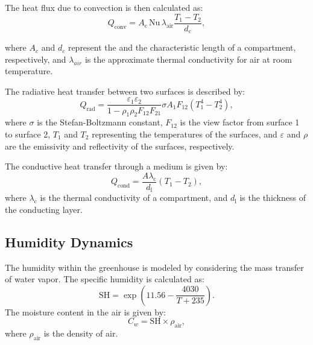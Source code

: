 \documentclass[conference]{IEEEtran}
\begin{document}
The heat flux due to convection is then calculated as:
\begin{equation}
    Q_{\text{conv}} = A_{\text{c}}\, \text{Nu}\, \lambda_{\text{air}} \frac{T_1 - T_2}{d_{\text{c}}},
\end{equation}

where \(A_c\) and \(d_c\) represent the and the characteristic length of a compartment, respectively, and \(\lambda_{air}\) is the approximate thermal conductivity for air at room temperature.

The radiative heat transfer between two surfaces is described by:
\begin{equation}
    Q_{\text{rad}} = \frac{\varepsilon_1  \varepsilon_2}{1 - \rho_1  \rho_2  F_{12}  F_{21}}  \sigma  A_1  F_{12}  \left( T_1^4 - T_2^4 \right),
\end{equation}
where \(\sigma \) is the Stefan-Boltzmann constant, \(F_{12}\) is the view factor from surface 1 to surface 2, \(T_1\) and \(T_2\) representing the temperatures of the surfaces, and \(\varepsilon \) and \(\rho \) are the emissivity and reflectivity of the surfaces, respectively.

The conductive heat transfer through a medium is given by:
\begin{equation}
    Q_{\text{cond}} = \frac{A \lambda_{\text{c}}}{d_\text{l}} (T_1 - T_2),
\end{equation}
where \(\lambda_{\text{c}} \) is the thermal conductivity of a compartment, and \(d_{\text{l}}\) is the thickness of the conducting layer.

\subsection{Humidity Dynamics}\label{subsec:humidity}

The humidity within the greenhouse is modeled by considering the mass transfer of water vapor. The specific humidity is calculated as:
\begin{equation}
    \text{SH} = \exp\left(11.56 - \frac{4030}{T + 235}\right).
\end{equation}
The moisture content in the air is given by:
\begin{equation}
    C_w = \text{SH} \times \rho_{\text{air}},
\end{equation}
where \(\rho_{\text{air}}\) is the density of air.

\end{document}
